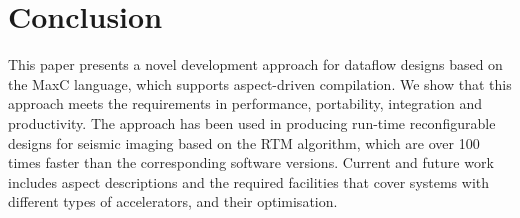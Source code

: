 \section{Conclusion}

This paper presents a novel development approach for dataflow designs
based on the MaxC language, which supports aspect-driven
compilation. We show that this approach meets the requirements in
performance, portability, integration and productivity. The approach
has been used in producing run-time reconfigurable designs for seismic
imaging based on the RTM algorithm, which are over 100 times faster
than the corresponding software versions. Current and future work
includes aspect descriptions and the required facilities that cover
systems with different types of accelerators, and their optimisation.
